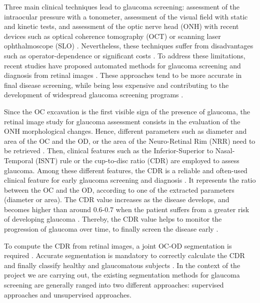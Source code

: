 Three main clinical techniques lead to glaucoma screening: assessment of the intraocular pressure with a tonometer, assessment of the visual field with static and kinetic tests, and assessment of the optic nerve head (ONH) with recent devices such as optical coherence tomography (OCT) or scanning laser ophthalmoscope (SLO) \citep{lim}. 
Nevertheless, these techniques suffer from disadvantages such as operator-dependence or significant  costs \citep{liu}.
To address these limitations, recent studies have proposed automated methods for glaucoma screening and diagnosis from retinal images \citep{bock2010,singh2}. These approaches tend to be more accurate in final disease screening, while being less expensive and contributing to the development of widespread glaucoma screening programs \citep{abramoff}.

Since the OC excavation is the first visible sign of the presence of glaucoma, the retinal image study for glaucoma assessment consists in the evaluation of the ONH morphological changes. 
Hence, different parameters such as diameter and area of the OC and the OD, or the area of the Neuro-Retinal Rim (NRR) need to be retrieved \citep{hu}. Then, clinical features such as the Inferior-Superior to Nasal-Temporal (ISNT) rule \citep{isnt} or the cup-to-disc ratio (CDR) \citep{cdr} are employed to assess glaucoma.
Among these different features, the CDR is a reliable and often-used clinical feature for early glaucoma screening and  diagnosis \citep{ophthal1}. It represents the ratio between the OC and the OD, according to one of the extracted parameters (diameter or area). The CDR value increases as the disease develops, and becomes higher than around 0.6-0.7 when the patient suffers from a greater risk of developing glaucoma \citep{abramoff}. Thereby, the CDR value helps to monitor the progression of glaucoma over time, to finally screen the disease early \citep{cdr}.

To compute the CDR from retinal images, a joint OC-OD segmentation is required \citep{cheng}. Accurate segmentation is mandatory to correctly calculate the CDR and finally classify healthy and glaucomatous subjects \cite{singh2}.
In the context of the project we are carrying out, the existing segmentation methods for glaucoma screening are generally ranged into two different approaches: supervised approaches and unsupervised approaches.

